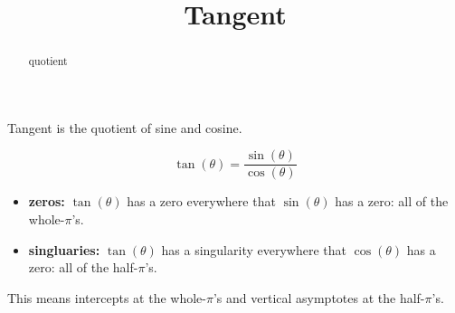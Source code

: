 \documentclass{ximera}
\title{Tangent}
\begin{document}
\begin{abstract}
quotient
\end{abstract}
\maketitle











Tangent is the quotient of sine and cosine.

\[   \tan(\theta)  =  \frac{\sin(\theta)}{\cos(\theta)}  \]


\begin{itemize}
\item \textbf{zeros:} $\tan(\theta)$ has a zero everywhere that $\sin(\theta)$ has a zero:  all of the whole-$\pi$'s.
\item \textbf{singluaries:} $\tan(\theta)$ has a singularity everywhere that $\cos(\theta)$ has a zero:  all of the half-$\pi$'s.
\end{itemize}

This means intercepts at the whole-$\pi$'s and vertical asymptotes at the half-$\pi$'s.
\end{document}
